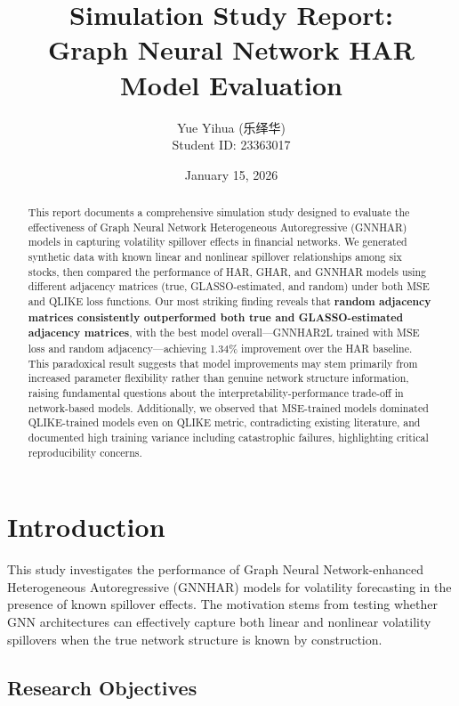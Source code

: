 \documentclass[10pt,a4paper]{article}
\title{Simulation Study Report:\\
Graph Neural Network HAR Model Evaluation}
\author{Yue Yihua (乐绎华)\\
Student ID: 23363017}
\date{January 15, 2026}
\begin{document}
\maketitle

\begin{abstract}
This report documents a comprehensive simulation study designed to evaluate the effectiveness of Graph Neural Network Heterogeneous Autoregressive (GNNHAR) models in capturing volatility spillover effects in financial networks. We generated synthetic data with known linear and nonlinear spillover relationships among six stocks, then compared the performance of HAR, GHAR, and GNNHAR models using different adjacency matrices (true, GLASSO-estimated, and random) under both MSE and QLIKE loss functions. Our most striking finding reveals that \textbf{random adjacency matrices consistently outperformed both true and GLASSO-estimated adjacency matrices}, with the best model overall---GNNHAR2L trained with MSE loss and random adjacency---achieving 1.34\% improvement over the HAR baseline. This paradoxical result suggests that model improvements may stem primarily from increased parameter flexibility rather than genuine network structure information, raising fundamental questions about the interpretability-performance trade-off in network-based models. Additionally, we observed that MSE-trained models dominated QLIKE-trained models even on QLIKE metric, contradicting existing literature, and documented high training variance including catastrophic failures, highlighting critical reproducibility concerns.
\end{abstract}

\tableofcontents
\newpage

\section{Introduction}

This study investigates the performance of Graph Neural Network-enhanced Heterogeneous Autoregressive (GNNHAR) models for volatility forecasting in the presence of known spillover effects. The motivation stems from testing whether GNN architectures can effectively capture both linear and nonlinear volatility spillovers when the true network structure is known by construction.

\subsection{Research Objectives}
\end{document}

